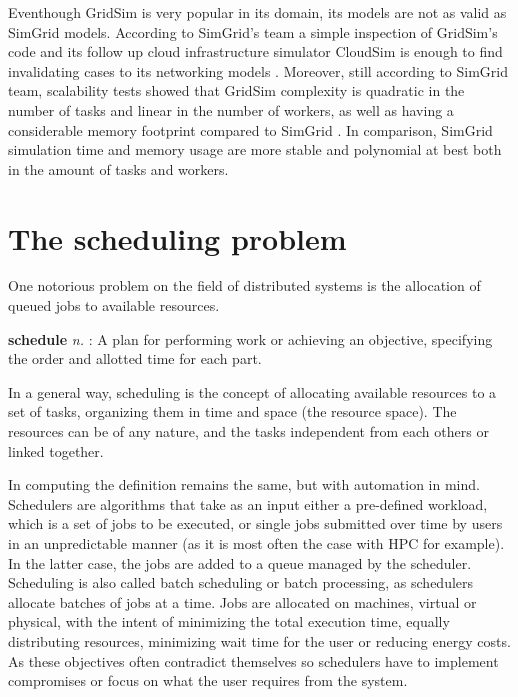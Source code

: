 Eventhough GridSim is very popular in its domain, its models are not as valid
as SimGrid models. According to SimGrid's team a simple inspection of GridSim's
code and its follow up cloud infrastructure simulator CloudSim \cite{cloudsim}
is enough to find invalidating cases to its networking models
\cite{10.1145/2517448}. Moreover, still according to SimGrid team, scalability
tests showed that GridSim complexity is quadratic in the number of tasks and
linear in the number of workers, as well as having a considerable memory
footprint compared to SimGrid \cite{casanova:hal-01017319}. In comparison,
SimGrid simulation time and memory usage are more stable and polynomial at best
both in the amount of tasks and workers.

\section{The scheduling problem}


One notorious problem on the field of distributed systems is the allocation of
queued jobs to available resources.

\begin{displayquote}[][]
	\textbf{schedule} \textit{n.} : A plan for
	performing work or achieving an objective, specifying the order and
	allotted time for each part.
\end{displayquote}

In a general way, scheduling is the concept of allocating available resources
to a set of tasks, organizing them in time and space (the resource space). The
resources can be of any nature, and the tasks independent from each others or
linked together.

In computing the definition remains the same, but with automation in mind.
Schedulers are algorithms that take as an input either a pre-defined workload,
which is a set of jobs  to be executed, or single jobs submitted over time by
users in an unpredictable manner (as it is most often the case with HPC for
example). In the latter case, the jobs are added to a queue managed by the
scheduler. Scheduling is also called batch scheduling or batch processing, as
schedulers allocate batches of jobs at a time. Jobs are allocated on machines,
virtual or physical, with the intent of minimizing the total execution time,
equally distributing resources, minimizing wait time for the user or reducing
energy costs. As these objectives often contradict themselves so schedulers have
to implement compromises or focus on what the user requires from the system.

